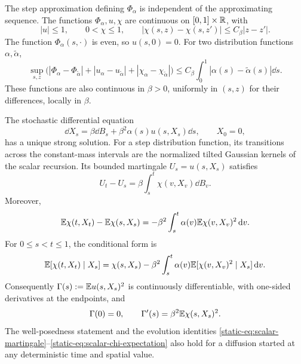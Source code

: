 \begin{lemma}
\label{static-lem:scalar-regularity}
The step approximation defining $\Phi_\alpha$ is independent of the
approximating sequence. The functions $\Phi_\alpha,u,\chi$ are continuous
on $[0,1]\times\mathbb R$, with
\begin{equation}\label{static-eq:scalar-derivative-bounds}
 |u|\le1,\qquad 0<\chi\le1,\qquad
 |\chi(s,z)-\chi(s,z')|\le C_\beta|z-z'|.
\end{equation}
The function $\Phi_\alpha(s,\cdot)$ is even, so $u(s,0)=0$.
For two distribution functions $\alpha,\widetilde\alpha$,
\begin{equation}\label{static-eq:scalar-stability}
 \sup_{s,z}\bigl(
 |\Phi_\alpha-\Phi_{\widetilde\alpha}|
 +|u_\alpha-u_{\widetilde\alpha}|
 +|\chi_\alpha-\chi_{\widetilde\alpha}|
 \bigr)
 \le C_\beta\int_0^1|\alpha(s)-\widetilde\alpha(s)|\dd s.
\end{equation}
These functions are also continuous in $\beta>0$, uniformly in $(s,z)$
for their differences, locally in $\beta$.

The stochastic differential equation
\begin{equation}\label{static-eq:scalar-diffusion}
 \dd X_s=\beta\dd B_s+\beta^2\alpha(s)u(s,X_s)\dd s,
 \qquad X_0=0,
\end{equation}
has a unique strong solution. For a step distribution function, its
transitions across the constant-mass intervals are the normalized tilted
Gaussian kernels of the scalar recursion. Its bounded martingale
$U_s=u(s,X_s)$ satisfies
\begin{equation}\label{static-eq:scalar-martingale}
 U_t-U_s=\beta\int_s^t\chi(v,X_v)\dd B_v.
\end{equation}
Moreover,
\begin{equation}\label{static-eq:scalar-chi-expectation}
 \mathbb E\chi(t,X_t)-\mathbb E\chi(s,X_s)
 =-\beta^2\int_s^t\alpha(v)\mathbb E\chi(v,X_v)^2\,\mathrm d v.
\end{equation}
For $0\le s<t\le1$, the conditional form is
\begin{equation}\label{eq:scalar-evolution}
 \mathbb E[\chi(t,X_t)\mid X_s]
 =\chi(s,X_s)-\beta^2\int_s^t\alpha(v)
                   \mathbb E[\chi(v,X_v)^2\mid X_s]\,\mathrm d v.
\end{equation}
Consequently $\Gamma(s):=\mathbb E u(s,X_s)^2$ is continuously differentiable,
with one-sided derivatives at the endpoints, and
\begin{equation}\label{static-eq:gamma-derivative}
 \Gamma(0)=0,\qquad
 \Gamma'(s)=\beta^2\mathbb E\chi(s,X_s)^2.
\end{equation}
The well-posedness statement and the evolution identities
\eqref{static-eq:scalar-martingale}--\eqref{static-eq:scalar-chi-expectation} also hold
for a diffusion started at any deterministic time and spatial value.
\end{lemma}

